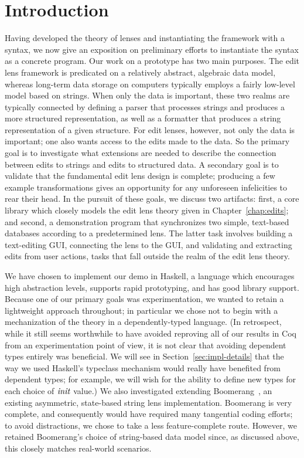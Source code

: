 \section{Introduction}
\label{sec:impl-intro}
Having developed the theory of lenses and instantiating the framework with a
syntax, we now give an exposition on preliminary efforts to instantiate the
syntax as a concrete program. Our work on a prototype has two main purposes.
The edit lens framework is predicated on a relatively abstract, algebraic
data model, whereas long-term data storage on computers typically employs a
fairly low-level model based on strings. When only the data is important,
these two realms are typically connected by defining a parser that processes
strings and produces a more structured representation, as well as a
formatter that produces a string representation of a given structure. For
edit lenses, however, not only the data is important; one also wants access
to the edits made to the data. So the primary goal is to investigate what
extensions are needed to describe the connection between edits to strings
and edits to structured data. A secondary goal is to validate that the
fundamental edit lens design is complete; producing a few example
transformations gives an opportunity for any unforeseen infelicities to rear
their head. In the pursuit of these goals, we discuss two artifacts: first,
a core library which closely models the edit lens theory given in
Chapter~\ref{chap:edits}; and second, a demonstration program that
synchronizes two simple, text-based databases according to a predetermined
lens. The latter task involves building a text-editing GUI, connecting the
lens to the GUI, and validating and extracting edits from user actions,
tasks that fall outside the realm of the edit lens theory.

We have chosen to implement our demo in Haskell, a language which encourages
high abstraction levels, supports rapid prototyping, and has good library
support. Because one of our primary goals was experimentation, we wanted to
retain a lightweight approach throughout; in particular we chose not to
begin with a mechanization of the theory in a dependently-typed language.
(In retrospect, while it still seems worthwhile to have avoided reproving
all of our results in Coq from an experimentation point of view, it is not
clear that avoiding dependent types entirely was beneficial. We will see in
Section~\ref{sec:impl-details} that the way we used Haskell's typeclass
mechanism would really have benefited from dependent types; for example, we
will wish for the ability to define new types for each choice of $\mathit{init}$
value.) We also investigated extending Boomerang~\cite{Boomerang07}, an
existing asymmetric, state-based string lens implementation. Boomerang is
very complete, and consequently would have required many tangential coding
efforts; to avoid distractions, we chose to take a less feature-complete
route. However, we retained Boomerang's choice of string-based data model
since, as discussed above, this closely matches real-world scenarios.

